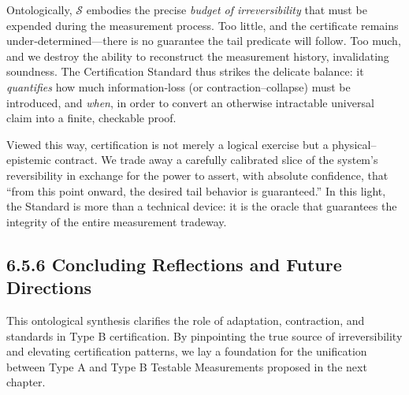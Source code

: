 \documentclass[12pt]{article}
\theoremstyle{definition}
\theoremstyle{plain}
\begin{document}
Ontologically, \(\mathcal S\) embodies the precise \emph{budget of irreversibility} that must be expended during the measurement process.  Too little, and the certificate remains under‐determined—there is no guarantee the tail predicate will follow.  Too much, and we destroy the ability to reconstruct the measurement history, invalidating soundness.  The Certification Standard thus strikes the delicate balance: it \emph{quantifies} how much information‑loss (or contraction–collapse) must be introduced, and \emph{when}, in order to convert an otherwise intractable universal claim into a finite, checkable proof.

Viewed this way, certification is not merely a logical exercise but a physical–epistemic contract.  We trade away a carefully calibrated slice of the system’s reversibility in exchange for the power to assert, with absolute confidence, that “from this point onward, the desired tail behavior is guaranteed.”  In this light, the Standard is more than a technical device: it is the oracle that guarantees the integrity of the entire measurement tradeway.  


\subsection*{6.5.6 Concluding Reflections and Future Directions}
This ontological synthesis clarifies the role of adaptation, contraction, and standards in Type B certification.  By pinpointing the true source of irreversibility and elevating certification patterns, we lay a foundation for the unification between Type A and Type B Testable Measurements proposed in the next chapter.
\end{document}
